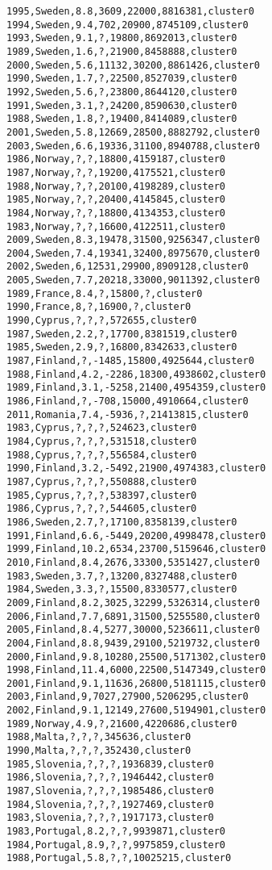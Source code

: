 \begin{lstlisting}[basicstyle=\footnotesize\ttfamily,numbers=none]
1995,Sweden,8.8,3609,22000,8816381,cluster0
1994,Sweden,9.4,702,20900,8745109,cluster0
1993,Sweden,9.1,?,19800,8692013,cluster0
1989,Sweden,1.6,?,21900,8458888,cluster0
2000,Sweden,5.6,11132,30200,8861426,cluster0
1990,Sweden,1.7,?,22500,8527039,cluster0
1992,Sweden,5.6,?,23800,8644120,cluster0
1991,Sweden,3.1,?,24200,8590630,cluster0
1988,Sweden,1.8,?,19400,8414089,cluster0
2001,Sweden,5.8,12669,28500,8882792,cluster0
2003,Sweden,6.6,19336,31100,8940788,cluster0
1986,Norway,?,?,18800,4159187,cluster0
1987,Norway,?,?,19200,4175521,cluster0
1988,Norway,?,?,20100,4198289,cluster0
1985,Norway,?,?,20400,4145845,cluster0
1984,Norway,?,?,18800,4134353,cluster0
1983,Norway,?,?,16600,4122511,cluster0
2009,Sweden,8.3,19478,31500,9256347,cluster0
2004,Sweden,7.4,19341,32400,8975670,cluster0
2002,Sweden,6,12531,29900,8909128,cluster0
2005,Sweden,7.7,20218,33000,9011392,cluster0
1989,France,8.4,?,15800,?,cluster0
1990,France,8,?,16900,?,cluster0
1990,Cyprus,?,?,?,572655,cluster0
1987,Sweden,2.2,?,17700,8381519,cluster0
1985,Sweden,2.9,?,16800,8342633,cluster0
1987,Finland,?,-1485,15800,4925644,cluster0
1988,Finland,4.2,-2286,18300,4938602,cluster0
1989,Finland,3.1,-5258,21400,4954359,cluster0
1986,Finland,?,-708,15000,4910664,cluster0
2011,Romania,7.4,-5936,?,21413815,cluster0
1983,Cyprus,?,?,?,524623,cluster0
1984,Cyprus,?,?,?,531518,cluster0
1988,Cyprus,?,?,?,556584,cluster0
1990,Finland,3.2,-5492,21900,4974383,cluster0
1987,Cyprus,?,?,?,550888,cluster0
1985,Cyprus,?,?,?,538397,cluster0
1986,Cyprus,?,?,?,544605,cluster0
1986,Sweden,2.7,?,17100,8358139,cluster0
1991,Finland,6.6,-5449,20200,4998478,cluster0
1999,Finland,10.2,6534,23700,5159646,cluster0
2010,Finland,8.4,2676,33300,5351427,cluster0
1983,Sweden,3.7,?,13200,8327488,cluster0
1984,Sweden,3.3,?,15500,8330577,cluster0
2009,Finland,8.2,3025,32299,5326314,cluster0
2006,Finland,7.7,6891,31500,5255580,cluster0
2005,Finland,8.4,5277,30000,5236611,cluster0
2004,Finland,8.8,9439,29100,5219732,cluster0
2000,Finland,9.8,10280,25500,5171302,cluster0
1998,Finland,11.4,6000,22500,5147349,cluster0
2001,Finland,9.1,11636,26800,5181115,cluster0
2003,Finland,9,7027,27900,5206295,cluster0
2002,Finland,9.1,12149,27600,5194901,cluster0
1989,Norway,4.9,?,21600,4220686,cluster0
1988,Malta,?,?,?,345636,cluster0
1990,Malta,?,?,?,352430,cluster0
1985,Slovenia,?,?,?,1936839,cluster0
1986,Slovenia,?,?,?,1946442,cluster0
1987,Slovenia,?,?,?,1985486,cluster0
1984,Slovenia,?,?,?,1927469,cluster0
1983,Slovenia,?,?,?,1917173,cluster0
1983,Portugal,8.2,?,?,9939871,cluster0
1984,Portugal,8.9,?,?,9975859,cluster0
1988,Portugal,5.8,?,?,10025215,cluster0

\end{lstlisting}
